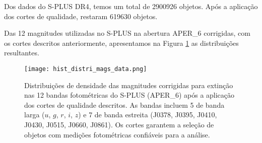 Dos dados do S-PLUS DR4, temos um total de 2900926 objetos. Após a aplicação dos cortes de qualidade, restaram 619630 objetos.

Das 12 magnitudes utilizadas no S-PLUS na abertura APER\_6 corrigidas, com os cortes descritos anteriormente, apresentamos na Figura \ref{fig:hist_distri_mags_data} as distribuições resultantes.

\begin{figure}[!ht]
    \begin{center}
    \texttt{[image: hist\_distri\_mags\_data.png]}
    \caption[]{Distribuições de densidade das magnitudes corrigidas para extinção nas 12 bandas fotométricas do S-PLUS (APER\_6) após a aplicação dos cortes de qualidade descritos. As bandas incluem 5 de banda larga ($u$, $g$, $r$, $i$, $z$) e 7 de banda estreita (J0378, J0395, J0410, J0430, J0515, J0660, J0861). Os cortes garantem a seleção de objetos com medições fotométricas confiáveis para a análise.}
    \label{fig:hist_distri_mags_data}
    \end{center}
\end{figure}
